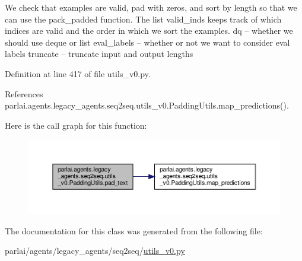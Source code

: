 \begin{DoxyVerb}We check that examples are valid, pad with zeros, and sort by length
   so that we can use the pack_padded function. The list valid_inds
   keeps track of which indices are valid and the order in which we sort
   the examples.
   dq -- whether we should use deque or list
   eval_labels -- whether or not we want to consider eval labels
   truncate -- truncate input and output lengths
\end{DoxyVerb}
 

Definition at line 417 of file utils\+\_\+v0.\+py.



References parlai.\+agents.\+legacy\+\_\+agents.\+seq2seq.\+utils\+\_\+v0.\+Padding\+Utils.\+map\+\_\+predictions().

Here is the call graph for this function\+:
\nopagebreak
\begin{figure}[H]
\begin{center}
\leavevmode
\includegraphics[width=350pt]{classparlai_1_1agents_1_1legacy__agents_1_1seq2seq_1_1utils__v0_1_1PaddingUtils_ae7f9ca3d9fd7dd823895a28af6cae34f_cgraph}
\end{center}
\end{figure}


The documentation for this class was generated from the following file\+:\begin{DoxyCompactItemize}
\item 
parlai/agents/legacy\+\_\+agents/seq2seq/\hyperlink{utils__v0_8py}{utils\+\_\+v0.\+py}\end{DoxyCompactItemize}
